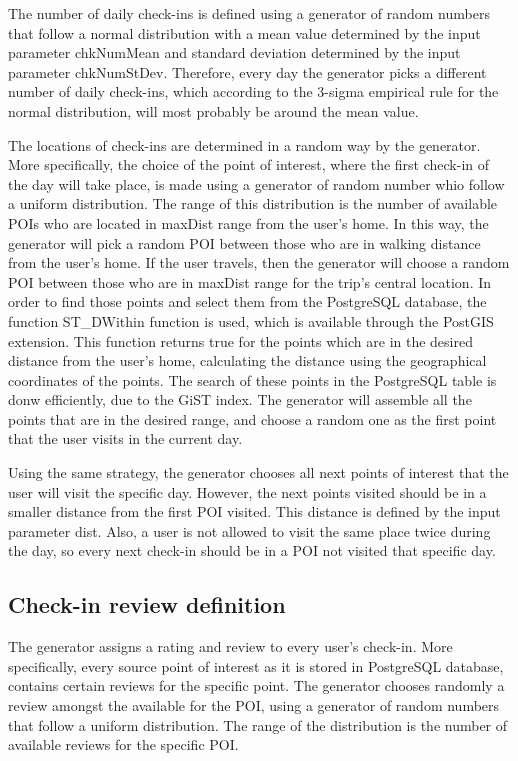 The number of daily check-ins is defined using a generator of random numbers that follow a normal distribution with a mean value determined by the input parameter 
chkNumMean and standard deviation determined by the input parameter chkNumStDev. Therefore, every day the generator picks a different number of daily check-ins, which 
according to the 3-sigma empirical rule for the normal distribution, will most probably be around the mean value.

The locations of check-ins are determined in a random way by the generator. More specifically, the choice of the point of interest, where the first check-in of the day 
will take place, is made using a generator of random number whio follow a uniform distribution. The range of this distribution is the number of available POIs 
who are located in maxDist range from the user's home. In this way, the generator will pick a random POI between those who are in walking distance from the user's home. 
If the user travels, then the generator will choose a random POI between those who are in maxDist range for the trip's central location. In order to find those 
points and select them from the PostgreSQL database, the function ST\_DWithin function is used, which is available through the PostGIS extension. 
This function returns true for the points which are in the desired distance from the user's home, calculating the distance using the geographical coordinates of the points. 
The search of these points in the PostgreSQL table is donw efficiently, due to the GiST index.
The generator will assemble all the points that are in the desired range, and choose a random one as the first point that the user visits in the current day. 

Using the same strategy, the generator chooses all next points of interest that the user will visit the specific day. However, the next points visited should be in 
a smaller distance from the first POI visited. This distance is defined by the input parameter dist. Also, a user is not allowed to visit the same place twice 
during the day, so every next check-in should be in a POI not visited that specific day.

\subsection{Check-in review definition}

The generator assigns a rating and review to every user's check-in. More specifically, every source point of interest as it is stored in PostgreSQL database, 
contains certain reviews for the specific point. The generator chooses randomly a review amongst the available for the POI, using a generator of random 
numbers that follow a uniform distribution. The range of the distribution is the number of available reviews for the specific POI.

